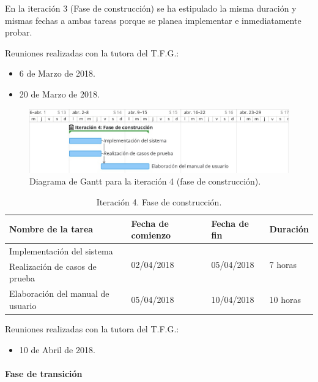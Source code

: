 \documentclass[twoside]{report}
\begin{document}
En la iteración 3 (Fase de construcción) se ha estipulado la misma duración y mismas fechas a ambas tareas porque se planea implementar e inmediatamente probar.

Reuniones realizadas con la tutora del T.F.G.:
\begin{itemize}
\item 6 de Marzo de 2018.
\item 20 de Marzo de 2018.
\end{itemize}


\begin{figure}[H]
\begin{center}
\includegraphics[width=\textwidth]{images/gantt/ite4}
\caption{Diagrama de Gantt para la iteración 4 (fase de construcción).}
\end{center}
\end{figure}

\begin{table}[H]
\centering
\begin{tabular}{|l|l|l|l|}
\hline
Nombre de la tarea                & Fecha de comienzo & Fecha de fin & Duración \\ \hline
Implementación del sistema        & \multirow{2}{*}{02/04/2018} & \multirow{2}{*}{05/04/2018}   & \multirow{2}{*}{7 horas}  \\
Realización de casos de prueba    & &   &   \\ \hline
Elaboración del manual de usuario & 05/04/2018        & 10/04/2018   & 10 horas   \\ \hline

\end{tabular}
\caption{Iteración 4. Fase de construcción.}
\end{table}

Reuniones realizadas con la tutora del T.F.G.:
\begin{itemize}
\item 10 de Abril de 2018.
\end{itemize}

\paragraph{Fase de transición}\mbox{}\\
\end{document}
